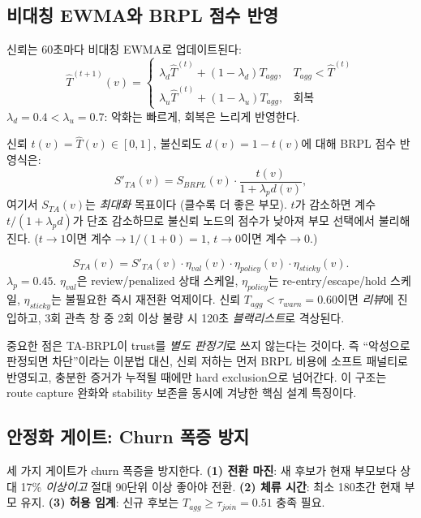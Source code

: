 \documentclass[10pt,a4paper,twocolumn]{article}
\begin{document}
\subsection{비대칭 EWMA와 BRPL 점수 반영}

신뢰는 60초마다 비대칭 EWMA로 업데이트된다:
\begin{equation}
  \hat{T}^{(t+1)}(v)=
  \begin{cases}
    \lambda_{d}\hat{T}^{(t)}+(1{-}\lambda_{d})T_{agg}, & T_{agg}<\hat{T}^{(t)}\\
    \lambda_{u}\hat{T}^{(t)}+(1{-}\lambda_{u})T_{agg}, & \text{회복}
  \end{cases}
  \label{eq:ewma}
\end{equation}
$\lambda_d=0.4<\lambda_u=0.7$: 악화는 빠르게, 회복은 느리게 반영한다.

신뢰 $t(v)=\hat{T}(v)\in[0,1]$, 불신뢰도 $d(v)=1-t(v)$에 대해
BRPL 점수 반영식은:
\begin{equation}
  S'_{TA}(v)=S_{BRPL}(v)\cdot\frac{t(v)}{1+\lambda_p d(v)},
  \label{eq:penalty}
\end{equation}
여기서 $S_{TA}(v)$는 \emph{최대화} 목표이다 (클수록 더 좋은 부모).
$t$가 감소하면 계수 $t/(1+\lambda_p d)$가 단조 감소하므로
불신뢰 노드의 점수가 낮아져 부모 선택에서 불리해진다.
($t\to1$이면 계수$\to 1/(1+0)=1$, $t\to0$이면 계수$\to0$.)

\begin{equation}
  S_{TA}(v)=S'_{TA}(v)\cdot\eta_{val}(v)\cdot\eta_{policy}(v)\cdot\eta_{sticky}(v).
  \label{eq:full}
\end{equation}
$\lambda_p=0.45$. $\eta_{val}$은 review/penalized 상태 스케일,
$\eta_{policy}$는 re-entry/escape/hold 스케일,
$\eta_{sticky}$는 불필요한 즉시 재전환 억제이다.
신뢰 $T_{agg}<\tau_{warn}=0.60$이면 \emph{리뷰}에 진입하고,
3회 관측 창 중 2회 이상 불량 시 120초 \emph{블랙리스트}로 격상된다.

중요한 점은 TA-BRPL이 trust를 \emph{별도 판정기}로 쓰지 않는다는 것이다.
즉 ``악성으로 판정되면 차단''이라는 이분법 대신,
신뢰 저하는 먼저 BRPL 비용에 소프트 패널티로 반영되고,
충분한 증거가 누적될 때에만 hard exclusion으로 넘어간다.
이 구조는 route capture 완화와 stability 보존을 동시에 겨냥한 핵심 설계 특징이다.

\subsection{안정화 게이트: Churn 폭증 방지}

세 가지 게이트가 churn 폭증을 방지한다.
\textbf{(1) 전환 마진}: 새 후보가 현재 부모보다 상대 17\% \emph{이상이고} 절대 90단위 이상 좋아야 전환.
\textbf{(2) 체류 시간}: 최소 180초간 현재 부모 유지.
\textbf{(3) 허용 임계}: 신규 후보는 $T_{agg}\ge\tau_{join}=0.51$ 충족 필요.
\end{document}
